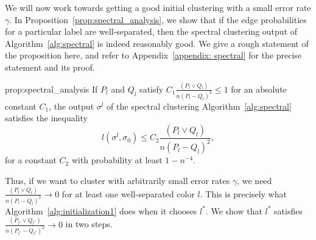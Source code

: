 \documentclass{article}
\begin{document}
We will now work towards getting a good initial clustering with a small error rate $\gamma$. In Proposition~\ref{prop:spectral_analysis}, we show that if the edge probabilities for a particular label are well-separated, then the spectral clustering output of Algorithm~\ref{alg:spectral} is indeed reasonably good. We give a rough statement of the proposition here, and refer to Appendix~\ref{appendix: spectral} for the precise statement and its proof.
\begin{repproposition}{prop:spectral_analysis}
If $P_l$ and $Q_l$ satisfy $C_1 \frac{(P_l \vee Q_l)}{n (P_l-Q_l)^2} \leq 1$ for an absolute constant $C_1$,  the output $\sigma^l$ of the spectral clustering Algorithm~\ref{alg:spectral} satisfies the inequality
\[
l(\sigma^l, \sigma_0) \leq C_2 \frac{(P_l \vee Q_l)}{n (P_l-Q_l)^2},
\]
for a constant $C_2$ with probability at least $1 - n^{-4}$.
\end{repproposition}
Thus, if we want to cluster with arbitrarily small error rates $\gamma$, we need $ \frac{(P_l \vee Q_l)}{n (P_l-Q_l)^2} \to 0$ for at least one well-separated color $l$. This is precisely what Algorithm~\ref{alg:initialization1} does when it chooses $l^*$. We show that $l^*$ satisfies $ \frac{(P_{l^*} \vee Q_{l^*})}{n (P_{l^*}-Q_{l^*})^2} \to 0$ in two steps. 

\medskip
\end{document}
